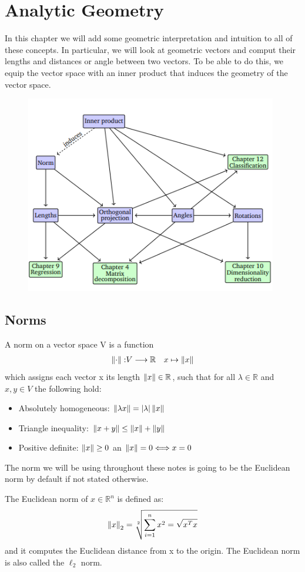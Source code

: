 \section{Analytic Geometry}
In this chapter we will add some geometric interpretation and intuition to all of these concepts. In particular, we will look at geometric vectors and comput their lengths and distances or angle between two vectors. To be able to do this, we equip the vector space with an inner product that induces the geometry of the vector space.
\begin{figure}[htbp]
    \centering
    \includegraphics[width=11cm]{Analytical Geometry/mindmap.png}
\end{figure}
\subsection{Norms}
\begin{definition}[Norm]
    A norm on a vector space V is a function 
    \begin{align*}
        \left\lVert\cdot\right\rVert: &V \longrightarrow \mathbb{R}
        &x \mapsto \left\lVert x\right\rVert
    \end{align*}
    which assigns each vector x its length $\left\lVert x\right\rVert \in \mathbb{R}$, such that for all $\lambda \in \mathbb{R}$ and $x,y \in V$ the following hold: 
    \begin{itemize}
        \item Absolutely homogeneous: $\left\lVert\lambda x\right\rVert = \left\lvert\lambda\right\rvert\left\lVert x\right\rVert$
        \item Triangle inequality: $\left\lVert x+y\right\rVert \leq \left\lVert x\right\rVert + \left\lVert y\right\rVert$
        \item Positive definite: $\left\lVert x\right\rVert \geq 0$ an $\left\lVert x\right\rVert = 0 \Longleftrightarrow x = 0$
    \end{itemize}
\end{definition}
The norm we will be using throughout these notes is going to be the Euclidean norm by default if not stated otherwise.
\begin{definition}
    The Euclidean norm of $x\in \mathbb{R}^n$ is defined as:
    \[ 
        \left\lVert x\right\rVert_{2} = \sqrt[2]{\sum_{i=1}^{n}{x^2} = \sqrt{x^Tx}}
    \]and it computes the Euclidean distance from x to the origin. The Euclidean norm is also called the $\ell_2$ norm.
\end{definition}
